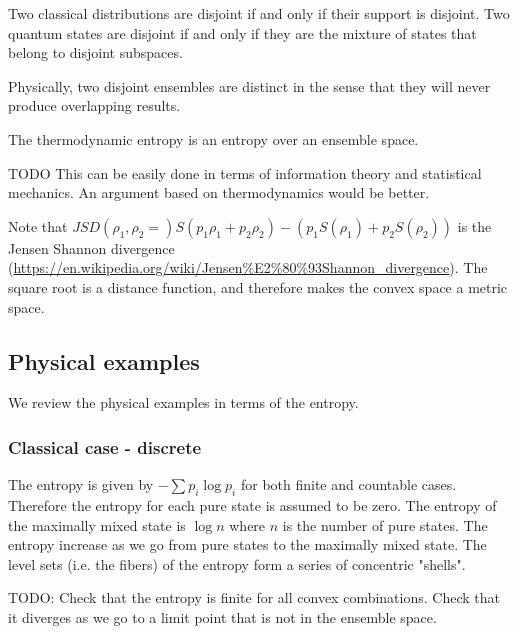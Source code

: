 \begin{remark}
	Two classical distributions are disjoint if and only if their support is disjoint. Two quantum states are disjoint if and only if they are the mixture of states that belong to disjoint subspaces.
	
	Physically, two disjoint ensembles are distinct in the sense that they will never produce overlapping results.
\end{remark}

\begin{prop}
	The thermodynamic entropy is an entropy over an ensemble space.
\end{prop}
\begin{justification}
	TODO This can be easily done in terms of information theory and statistical mechanics. An argument based on thermodynamics would be better.
\end{justification}

\begin{remark}
	Note that $JSD(\rho_1, \rho_2 = )S(p_1\rho_1 + p_2 \rho_2) - (p_1 S(\rho_1) + p_2 S(\rho_2))$ is the Jensen Shannon divergence (\url{https://en.wikipedia.org/wiki/Jensen%E2%80%93Shannon_divergence}). The square root is a distance function, and therefore makes the convex space a metric space.
\end{remark}

\subsection{Physical examples}

We review the physical examples in terms of the entropy.

\subsubsection{Classical case - discrete}

The entropy is given by $-\sum p_i \log p_i$ for both finite and countable cases. Therefore the entropy for each pure state is assumed to be zero. The entropy of the maximally mixed state is $\log n$ where $n$ is the number of pure states. The entropy increase as we go from pure states to the maximally mixed state. The level sets (i.e. the fibers) of the entropy form a series of concentric "shells".

TODO: Check that the entropy is finite for all convex combinations. Check that it diverges as we go to a limit point that is not in the ensemble space.

